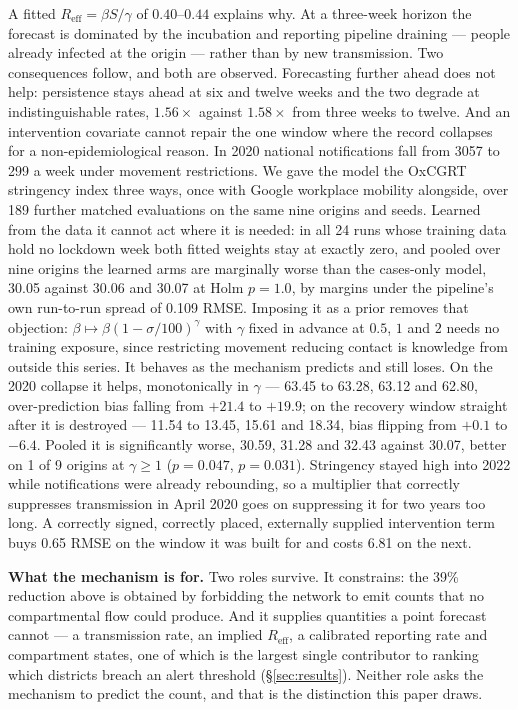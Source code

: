 A fitted $R_{\mathrm{eff}} = \beta S / \gamma$ of $0.40$--$0.44$ explains why.
At a three-week horizon the forecast is dominated by the incubation and reporting
pipeline draining --- people already infected at the origin --- rather than by new
transmission. Two consequences follow, and both are observed. Forecasting further
ahead does not help: persistence stays ahead at six and twelve weeks and the two
degrade at indistinguishable rates, $1.56\times$ against $1.58\times$ from three
weeks to twelve. And an intervention covariate cannot repair the one window
where the record collapses for a non-epidemiological reason. In 2020 national
notifications fall from 3057 to 299 a week under movement restrictions. We gave
the model the OxCGRT stringency index three ways, once with Google workplace
mobility alongside, over 189 further matched evaluations on the same nine origins
and seeds. Learned from the data it cannot act where it is needed: in all 24 runs
whose training data hold no lockdown week both fitted weights stay at exactly
zero, and pooled over nine origins the learned arms are marginally worse than the
cases-only model, 30.05 against 30.06 and 30.07 at Holm $p = 1.0$, by margins
under the pipeline's own run-to-run spread of 0.109 RMSE. Imposing it as a prior
removes that objection: $\beta \mapsto \beta(1 - \sigma/100)^{\gamma}$ with
$\gamma$ fixed in advance at $0.5$, $1$ and $2$ needs no training exposure, since
restricting movement reducing contact is knowledge from outside this series. It
behaves as the mechanism predicts and still loses. On the 2020 collapse it helps,
monotonically in $\gamma$ --- 63.45 to 63.28, 63.12 and 62.80, over-prediction
bias falling from $+21.4$ to $+19.9$; on the recovery window straight after it is
destroyed --- 11.54 to 13.45, 15.61 and 18.34, bias flipping from $+0.1$ to
$-6.4$. Pooled it is significantly worse, 30.59, 31.28 and 32.43 against 30.07,
better on 1 of 9 origins at $\gamma \ge 1$ ($p = 0.047$, $p = 0.031$).
Stringency stayed high into 2022 while notifications were already rebounding, so a
multiplier that correctly suppresses transmission in April 2020 goes on
suppressing it for two years too long. A correctly signed, correctly placed,
externally supplied intervention term buys 0.65 RMSE on the window it was built
for and costs 6.81 on the next.

\textbf{What the mechanism is for.} Two roles survive. It constrains: the 39\%
reduction above is obtained by forbidding the network to emit counts that no
compartmental flow could produce. And it supplies quantities a point forecast
cannot --- a transmission rate, an implied $R_{\mathrm{eff}}$, a calibrated
reporting rate and compartment states, one of which is the largest single
contributor to ranking which districts breach an alert threshold
(\S\ref{sec:results}). Neither role asks the mechanism to predict the count, and
that is the distinction this paper draws.
